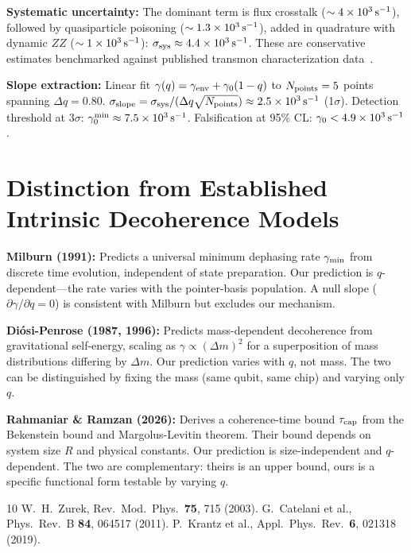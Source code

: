 \documentclass[aps,prl,twocolumn]{revtex4-2}
\begin{document}
\textbf{Systematic uncertainty:} The dominant term is flux crosstalk ($\sim 4\times 10^3\,{\rm s}^{-1}$), followed by quasiparticle poisoning ($\sim 1.3\times 10^3\,{\rm s}^{-1}$), added in quadrature with dynamic $ZZ$ ($\sim 1\times 10^3\,{\rm s}^{-1}$): $\sigma_{\rm sys} \approx 4.4 \times 10^3\,{\rm s}^{-1}$. These are conservative estimates benchmarked against published transmon characterization data~\cite{Krantz:2019}.

\textbf{Slope extraction:} Linear fit $\gamma(q) = \gamma_{\rm env} + \gamma_0(1-q)$ to $N_{\rm points}=5$ points spanning $\Delta q = 0.80$. $\sigma_{\rm slope} = \sigma_{\rm sys}/(\Delta q\sqrt{N_{\rm points}}) \approx 2.5 \times 10^3\,{\rm s}^{-1}$ (1$\sigma$). Detection threshold at $3\sigma$: $\gamma_0^{\rm min} \approx 7.5 \times 10^3\,{\rm s}^{-1}$. Falsification at 95\% CL: $\gamma_0 < 4.9 \times 10^3\,{\rm s}^{-1}$.

\section{Distinction from Established Intrinsic Decoherence Models}

\textbf{Milburn (1991):} Predicts a universal minimum dephasing rate $\gamma_{\rm min}$ from discrete time evolution, independent of state preparation. Our prediction is $q$-dependent---the rate varies with the pointer-basis population. A null slope ($\partial\gamma/\partial q = 0$) is consistent with Milburn but excludes our mechanism.

\textbf{Di\'osi-Penrose (1987, 1996):} Predicts mass-dependent decoherence from gravitational self-energy, scaling as $\gamma \propto (\Delta m)^2$ for a superposition of mass distributions differing by $\Delta m$. Our prediction varies with $q$, not mass. The two can be distinguished by fixing the mass (same qubit, same chip) and varying only $q$.

\textbf{Rahmaniar \& Ramzan (2026):} Derives a coherence-time bound $\tau_{\rm cap}$ from the Bekenstein bound and Margolus-Levitin theorem. Their bound depends on system size $R$ and physical constants. Our prediction is size-independent and $q$-dependent. The two are complementary: theirs is an upper bound, ours is a specific functional form testable by varying $q$.

\begin{thebibliography}{10}
 W.~H.~Zurek, Rev.\ Mod.\ Phys.\ \textbf{75}, 715 (2003).
 G.~Catelani et al., Phys.\ Rev.\ B \textbf{84}, 064517 (2011).
 P.~Krantz et al., Appl.\ Phys.\ Rev.\ \textbf{6}, 021318 (2019).
\end{thebibliography}
\end{document}
